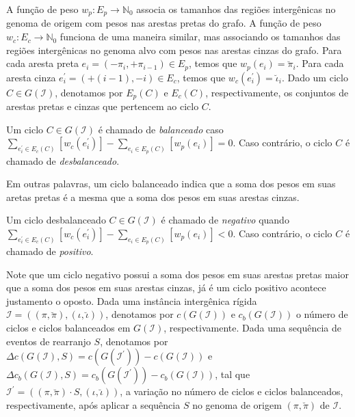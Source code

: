 A função de peso $w_p : E_p \rightarrow \mathbb{N}_0$ associa os tamanhos das regiões intergênicas no genoma de origem com pesos nas arestas pretas do grafo. A função de peso $w_c : E_c \rightarrow \mathbb{N}_0$ funciona de uma maneira similar, mas associando os tamanhos das regiões intergênicas no genoma alvo com pesos nas arestas cinzas do grafo. Para cada aresta preta $e_i = (-\pi_i, +\pi_{i-1}) \in E_p$, temos que $w_p(e_i) = \breve\pi_i$. Para cada aresta cinza $e^{\prime}_i = (+(i-1), -i) \in E_c$, temos que $w_c(e^{\prime}_i) = \breve\iota_i$. Dado um ciclo $C \in G(\mathcal{I})$, denotamos por $E_p(C)$ e $E_c(C)$, respectivamente, os conjuntos de arestas pretas e cinzas que pertencem ao ciclo $C$. 

\begin{definition}
Um ciclo $C \in G(\mathcal{I})$ é chamado de \emph{balanceado} caso $\sum_{e^{\prime}_i \in E_c(C)} [w_c(e^{\prime}_i)] - \sum_{e_i \in E_p(C)} [w_p(e_i)] = 0$. Caso contrário, o ciclo $C$ é chamado de \emph{desbalanceado}.
\end{definition}

Em outras palavras, um ciclo balanceado indica que a soma dos pesos em suas aretas pretas é a mesma que a soma dos pesos em suas arestas cinzas. 

\begin{definition}
Um ciclo desbalanceado $C \in G(\mathcal{I})$ é chamado de \emph{negativo} quando $\sum_{e^{\prime}_i \in E_c(C)} [w_c(e^{\prime}_i)] - \sum_{e_i \in E_p(C)} [w_p(e_i)] < 0$. Caso contrário, o ciclo $C$ é chamado de \emph{positivo}.
\end{definition}

Note que um ciclo negativo possui a soma dos pesos em suas arestas pretas maior que a soma dos pesos em suas arestas cinzas, já é um ciclo positivo acontece justamento o oposto. Dada uma instância intergênica rígida $\mathcal{I} = ((\pi,\breve\pi),(\iota,\breve\iota))$, denotamos por $c(G(\mathcal{I}))$ e $c_b(G(\mathcal{I}))$ o número de ciclos e ciclos balanceados em $G(\mathcal{I})$, respectivamente. Dada uma sequência de eventos de rearranjo $S$, denotamos por $\Delta c(G(\mathcal{I}), S) = c(G(\mathcal{I^{\prime}})) - c(G(\mathcal{I}))$ e $\Delta c_b(G(\mathcal{I}), S) = c_b(G(\mathcal{I^{\prime}})) - c_b(G(\mathcal{I}))$, tal que $\mathcal{I^{\prime}} = ((\pi,\breve\pi) \cdot S,(\iota,\breve\iota))$, a variação no número de ciclos e ciclos balanceados, respectivamente, após aplicar a sequência $S$ no genoma de origem $(\pi,\breve\pi)$ de $\mathcal{I}$.

